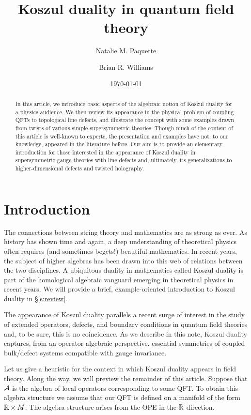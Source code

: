 \documentclass[11pt]{amsart}
\author{Natalie M. Paquette}
\author{Brian R. Williams}
\date{\today}
\title{Koszul duality in quantum field theory}
\begin{document}
\maketitle

\begin{abstract}
In this article, we introduce basic aspects of the algebraic notion of Koszul duality for a physics audience. We then review its appearance in the physical problem of coupling QFTs to topological line defects, and illustrate the concept with some examples drawn from twists of various simple supersymmetric theories. Though much of the content of this article is well-known to experts, the presentation and examples have not, to our knowledge, appeared in the literature before. Our aim is to provide an elementary introduction for those interested in the appearance of Koszul duality in supersymmetric gauge theories with line defects and, ultimately, its generalizations to higher-dimensional defects and twisted holography. 
\end{abstract}


\section{Introduction}

The connections between string theory and mathematics are as strong as ever.  As history has shown time and again, a deep understanding of theoretical physics often requires (and sometimes begets!) beautiful mathematics. In recent years, the subject of higher algebras has been drawn into this web of relations between the two disciplines. A ubiquitous duality in mathematics called Koszul duality is part of the homological algebraic vanguard emerging in theoretical physics in recent years. We will provide a brief, example-oriented introduction to Koszul duality in \S \ref{s:review}. 

The appearance of Koszul duality parallels a recent surge of interest in the study of extended operators, defects, and boundary conditions in quantum field theories and, to be sure, this is no coincidence. As we describe in this note, Koszul duality captures, from an operator algebraic perspective, essential symmetries of coupled bulk/defect systems compatible with gauge invariance. 

Let us give a heuristic for the context in which Koszul duality appears in field theory. Along the way, we will preview the remainder of this article. 
Suppose that $\mathcal A$ is the algebra of local operators corresponding to some QFT. 
To obtain this algebra structure we assume that our QFT is defined on a manifold of the form $\mathbb R \times M$. 
The algebra structure arises from the OPE in the $\mathbb R$-direction.  
\end{document}
